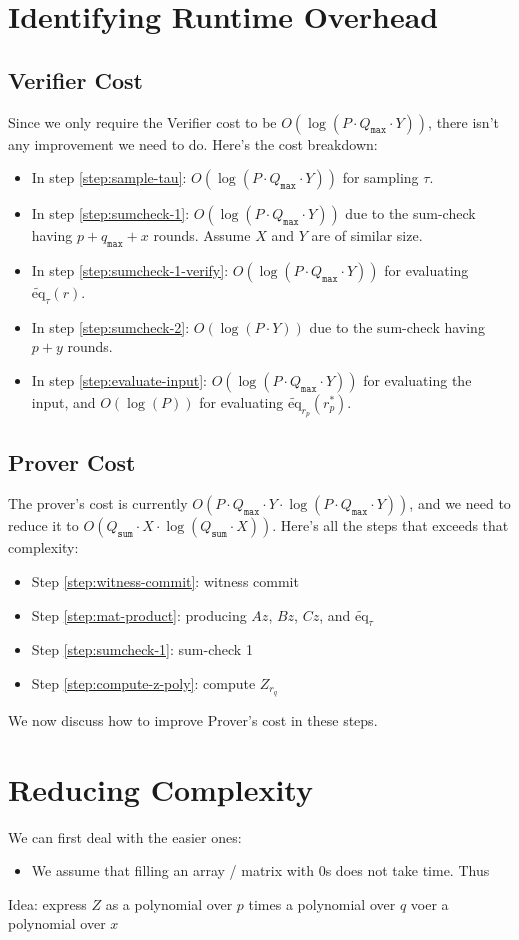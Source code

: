 \documentclass{article}
\newcommand{\Qsum}{Q_{\mathtt{sum}}}
\newcommand{\Qmax}{Q_{\mathtt{max}}}
\newcommand{\qmax}{q_{\mathtt{max}}}
\newcommand{\eq}{\widetilde{\mbox{eq}}}
\begin{document}
\section{Identifying Runtime Overhead}\label{identify}
\subsection{Verifier Cost}
Since we only require the Verifier cost to be $O(\log(P \cdot \Qmax \cdot Y))$, there isn't any improvement we need to do. Here's the cost breakdown:
\begin{itemize}
    \item In step \ref{step:sample-tau}: $O(\log(P \cdot \Qmax \cdot Y))$ for sampling $\tau$.
    \item In step \ref{step:sumcheck-1}: $O(\log(P \cdot \Qmax \cdot Y))$ due to the sum-check having $p + \qmax + x$ rounds. Assume $X$ and $Y$ are of similar size.
    \item In step \ref{step:sumcheck-1-verify}: $O(\log(P \cdot \Qmax \cdot Y))$ for evaluating $\eq_\tau(r)$.
    \item In step \ref{step:sumcheck-2}: $O(\log(P \cdot Y))$ due to the sum-check having $p + y$ rounds.
    \item In step \ref{step:evaluate-input}: $O(\log(P \cdot \Qmax \cdot Y))$ for evaluating the input, and $O(\log(P))$ for evaluating $\eq_{r_p}(r_p^*)$.
\end{itemize}

\subsection{Prover Cost}
The prover's cost is currently $O(P\cdot\Qmax\cdot Y\cdot\log(P \cdot \Qmax \cdot Y))$, and we need to reduce it to $O(\Qsum \cdot X\cdot\log(\Qsum \cdot X))$. Here's all the steps that exceeds that complexity:
\begin{itemize}
    \item Step \ref{step:witness-commit}: witness commit
    \item Step \ref{step:mat-product}: producing $Az$, $Bz$, $Cz$, and $\eq_\tau$
    \item Step \ref{step:sumcheck-1}: sum-check 1
    \item Step \ref{step:compute-z-poly}: compute $Z_{r_q}$
\end{itemize}
We now discuss how to improve Prover's cost in these steps.

\section{Reducing Complexity}\label{reduce}
We can first deal with the easier ones:
\begin{itemize}
    \item We assume that filling an array / matrix with 0s does not take time. Thus
\end{itemize}

Idea: express $Z$ as a polynomial over $p$ times a polynomial over $q$ voer a polynomial over $x$
\end{document}
